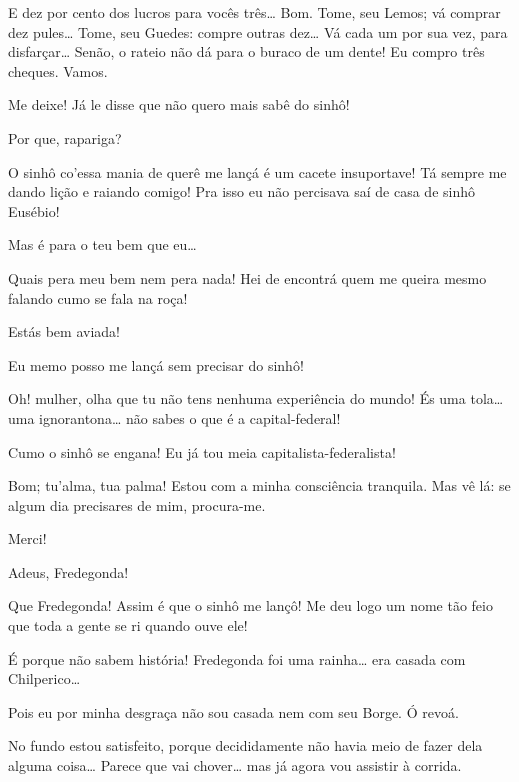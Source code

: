  E dez por cento dos lucros para vocês três\ldots{} Bom.  Tome, seu Lemos; vá comprar dez pules\ldots{} 
Tome, seu Guedes: compre outras dez\ldots{} Vá cada um por sua vez, para
disfarçar\ldots{} Senão, o rateio não dá para o buraco de um dente! Eu compro três cheques.
Vamos. 


 Me deixe! Já le disse que não quero mais sabê do sinhô!

 Por que, rapariga?

 O sinhô co’essa mania de querê me lançá é um cacete insuportave! Tá 
sempre me dando lição e raiando comigo! Pra isso eu não percisava saí de
casa de sinhô Eusébio!

 Mas é para o teu bem que eu\ldots{}

 Quais pera meu bem nem pera nada! Hei de encontrá quem me queira 
mesmo falando cumo se fala na roça!

 Estás bem aviada!

 Eu memo posso me lançá sem precisar do sinhô!

 Oh! mulher, olha que tu não tens nenhuma experiência do mundo! És 
uma tola\ldots{} uma ignorantona\ldots{} não sabes o que é a capital-federal!

 Cumo o sinhô se engana! Eu já tou meia capitalista-federalista!

 Bom; tu’alma, tua palma! Estou com a minha consciência
tranquila. Mas vê lá: se algum dia precisares de mim, procura-me.

 Merci! 

 Adeus, Fredegonda!

  Que Fredegonda! Assim é que o sinhô me lançô! Me deu 
logo um nome tão feio que toda a gente se ri quando ouve ele!

 É porque não sabem história! Fredegonda foi uma rainha\ldots{} era 
casada com Chilperico\ldots{}

 Pois eu por minha desgraça não sou casada nem com seu Borge. Ó 
revoá. 

  No fundo estou satisfeito, porque decididamente não
havia meio de fazer dela alguma coisa\ldots{} Parece que vai chover\ldots{} mas já agora vou
assistir à corrida. 

